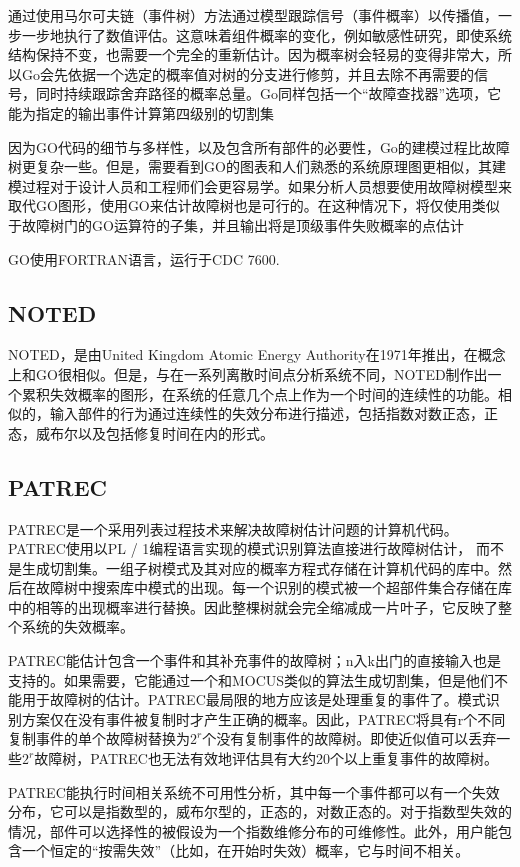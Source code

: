 \documentclass[cn,11pt,chinese]{elegantbook}
\begin{document}
{通过使用马尔可夫链（事件树）方法通过模型跟踪信号（事件概率）以传播值，一步一步地执行了数值评估。这意味着组件概率的变化，例如敏感性研究，即使系统结构保持不变，也需要一个完全的重新估计。因为概率树会轻易的变得非常大，所以Go会先依据一个选定的概率值对树的分支进行修剪，并且去除不再需要的信号，同时持续跟踪舍弃路径的概率总量。Go同样包括一个“故障查找器”选项，它能为指定的输出事件计算第四级别的切割集

因为GO代码的细节与多样性，以及包含所有部件的必要性，Go的建模过程比故障树更复杂一些。但是，需要看到GO的图表和人们熟悉的系统原理图更相似，其建模过程对于设计人员和工程师们会更容易学。如果分析人员想要使用故障树模型来取代GO图形，使用GO来估计故障树也是可行的。在这种情况下，将仅使用类似于故障树门的GO运算符的子集，并且输出将是顶级事件失败概率的点估计

GO使用FORTRAN语言，运行于CDC 7600.

\subsection{NOTED}

NOTED，是由United Kingdom Atomic Energy Authority在1971年推出，在概念上和GO很相似。但是，与在一系列离散时间点分析系统不同，NOTED制作出一个累积失效概率的图形，在系统的任意几个点上作为一个时间的连续性的功能。相似的，输入部件的行为通过连续性的失效分布进行描述，包括指数对数正态，正态，威布尔以及包括修复时间在内的形式。

\subsection{PATREC}

PATREC是一个采用列表过程技术来解决故障树估计问题的计算机代码。PATREC使用以PL / 1编程语言实现的模式识别算法直接进行故障树估计， 而不是生成切割集。一组子树模式及其对应的概率方程式存储在计算机代码的库中。然后在故障树中搜索库中模式的出现。每一个识别的模式被一个超部件集合存储在库中的相等的出现概率进行替换。因此整棵树就会完全缩减成一片叶子，它反映了整个系统的失效概率。

PATREC能估计包含一个事件和其补充事件的故障树；n入k出门的直接输入也是支持的。如果需要，它能通过一个和MOCUS类似的算法生成切割集，但是他们不能用于故障树的估计。PATREC最局限的地方应该是处理重复的事件了。模式识别方案仅在没有事件被复制时才产生正确的概率。因此，PATREC将具有r个不同复制事件的单个故障树替换为$2^r$个没有复制事件的故障树。即使近似值可以丢弃一些$2^r$故障树，PATREC也无法有效地评估具有大约20个以上重复事件的故障树。

PATREC能执行时间相关系统不可用性分析，其中每一个事件都可以有一个失效分布，它可以是指数型的，威布尔型的，正态的，对数正态的。对于指数型失效的情况，部件可以选择性的被假设为一个指数维修分布的可维修性。此外，用户能包含一个恒定的“按需失效”（比如，在开始时失效）概率，它与时间不相关。

}
\end{document}
